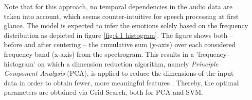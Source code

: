 \documentclass[11pt,a4paper,twoside]{article}
\theoremstyle{thmbreak}
\numberwithin{Theorem}{subsection}
\theoremstyle{defbreak}
\theoremstyle{remark}
\theoremstyle{remark}
\begin{document}

Note that for this approach, no temporal dependencies in the audio data are taken into account, which seems counter-intuitive for speech processing at first glance. The model is expected to infer the emotions solely based on the frequency distribution as depicted in figure \ref{fig:4.1 histogram}. The figure shows both -- before and after centering -- the cumulative sum (y-axis) over each considered frequency band (x-axis) from the spectrogram. 
This results in a 'frequency-histogram' on which a dimension reduction algorithm, namely \textit{Principle Component Analysis }(PCA), is applied to reduce the dimensions of the input data  in order to obtain fewer, more meaningful features \cite{bishop2006pattern}. Thereby, the optimal parameters are obtained via Grid Search, both for PCA and SVM.
\end{document}
